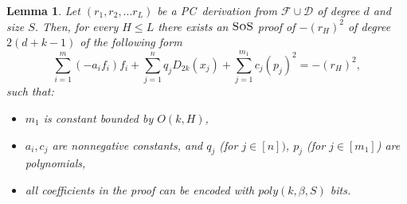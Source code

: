 \documentclass[11pt]{article}
\newcommand{\sos}{\text{\sc{SoS}}}
\newcommand{\PC}{\textsc{PC}}
\newcommand{\1}{\textbf{1}}
\newtheorem{lemma}[theorem]{Lemma}
\begin{document}
%




%

\begin{lemma}\label{th:sos_sim_PC_1}
    Let $(r_1, r_2, \dots r_L)$ be a \PC\ derivation from $\mathcal{F}\cup \mathcal{D}$ of degree $d$ and size $S$. Then, for every $H\leq L$ there exists an $\sos$ proof of $-(r_H)^2$ of degree $2(d+k-1)$ of the following form
    \begin{equation}\label{eq:sosstep}
         \sum_{i=1}^m (-a_i f_i) f_i + \sum_{j=1}^{n} q_j D_{2k}(x_j) +\sum_{j=1}^{m_1} c_{j}(p_{j})^2=-(r_H)^2,
    \end{equation}
    such that:
    \begin{itemize}
        \item $m_1$ is constant bounded by $O(k, H)$,
        \item $a_i, c_j$ are nonnegative constants, and $q_j$ (for $j\in [n])$, $p_j$ (for $j\in [m_1]$) are polynomials,
        
        \item all coefficients in the proof can be encoded with $poly(k, \beta, S)$ bits.
    \end{itemize}
\end{lemma}
\end{document}
